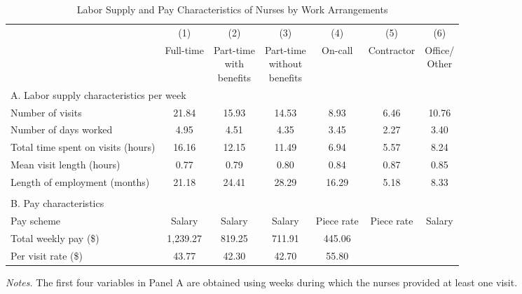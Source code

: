 \documentclass[final,12pt]{article}
\begin{document}
\begin{singlespace}
\newpage
\begin{table}[H]
\footnotesize
\setlength\tabcolsep{5pt}
\centering
\caption{Labor Supply and Pay Characteristics of Nurses by Work Arrangements}
\label{tab:diff_nurses}
\begin{threeparttable}
\def\sym#1{\ifmmode^{#1}\else\(^{#1}\)\fi}
\begin{tabular}{l*{6}c}
\toprule
 & (1) & (2) & (3) & (4) & (5) & (6) \\
& Full-time & \shortstack{Part-time\\with\\benefits} & \shortstack{Part-time\\without\\ benefits} & On-call & Contractor & \shortstack{Office/\\Other}  \\
\midrule
 \multicolumn{7}{l}{A. Labor supply characteristics per week} \\
Number of visits  & 21.84  & 15.93  & 14.53  & 8.93  & 6.46  & 10.76 \\
Number of days worked  & 4.95  & 4.51  & 4.35  & 3.45  & 2.27  & 3.40 \\
Total time spent on visits (hours)  & 16.16  & 12.15  & 11.49  & 6.94  & 5.57  & 8.24 \\
Mean visit length (hours)  & 0.77  & 0.79  & 0.80  & 0.84  & 0.87  & 0.85 \\
Length of employment (months)  & 21.18 & 24.41 & 28.29 & 16.29 & 5.18 & 8.33 \\
\\
\multicolumn{7}{l}{B. Pay characteristics} \\
Pay scheme & Salary & Salary & Salary & Piece rate & Piece rate & Salary \\
Total weekly pay (\$)  & 1,239.27  & 819.25  & 711.91  & 445.06  &   &  \\
Per visit rate (\$) & 43.77  & 42.30  & 42.70  & 55.80 &  & \\
\bottomrule
\end{tabular}
	\begin{tablenotes}
	\footnotesize
	\item \emph{Notes.} The first four variables in Panel A are obtained using weeks during which the nurses provided at least one visit.

\end{tablenotes}
\end{threeparttable}
\end{table}
\end{singlespace}
\end{document}
